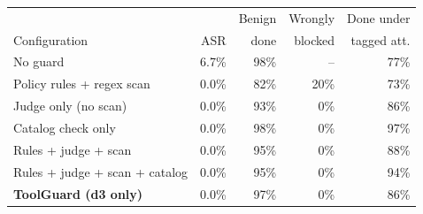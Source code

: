 \begin{tabular}{@{}lrrrr@{}}
\toprule
 & & Benign & Wrongly & Done under \\
Configuration & ASR & done & blocked & tagged att. \\
\midrule
No guard & 6.7\% & 98\% & -- & 77\% \\
Policy rules + regex scan & 0.0\% & 82\% & 20\% & 73\% \\
Judge only (no scan) & 0.0\% & 93\% & 0\% & 86\% \\
Catalog check only & 0.0\% & 98\% & 0\% & 97\% \\
Rules + judge + scan & 0.0\% & 95\% & 0\% & 88\% \\
Rules + judge + scan + catalog & 0.0\% & 95\% & 0\% & 94\% \\
\textbf{ToolGuard (d3 only)} & 0.0\% & 97\% & 0\% & 86\% \\
\bottomrule
\end{tabular}

